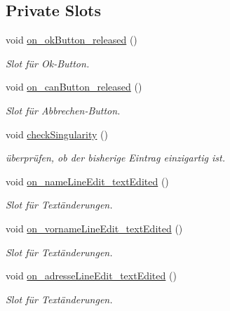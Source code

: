 \subsection*{Private Slots}
\begin{CompactItemize}
\item 
void \hyperlink{class_r_f_i_d_input_dialog_bfc414e920d8c099a56c253ec07a6fa7}{on\_\-okButton\_\-released} ()
\begin{CompactList}\small\item\em Slot für Ok-Button. \item\end{CompactList}\item 
void \hyperlink{class_r_f_i_d_input_dialog_8f58e254774a1995a54ed0be10183ad9}{on\_\-canButton\_\-released} ()
\begin{CompactList}\small\item\em Slot für Abbrechen-Button. \item\end{CompactList}\item 
void \hyperlink{class_r_f_i_d_input_dialog_02ecbebd64e8e4d176f9da497366dede}{checkSingularity} ()
\begin{CompactList}\small\item\em überprüfen, ob der bisherige Eintrag einzigartig ist. \item\end{CompactList}\item 
void \hyperlink{class_r_f_i_d_input_dialog_5318d27b73bdd6b480d2bd7e4393d9b3}{on\_\-nameLineEdit\_\-textEdited} ()
\begin{CompactList}\small\item\em Slot für Textänderungen. \item\end{CompactList}\item 
void \hyperlink{class_r_f_i_d_input_dialog_dbd5b406b288c271329508dff10de89e}{on\_\-vornameLineEdit\_\-textEdited} ()
\begin{CompactList}\small\item\em Slot für Textänderungen. \item\end{CompactList}\item 
void \hyperlink{class_r_f_i_d_input_dialog_088462e0b153f91f99f4cd076cdb014d}{on\_\-adresseLineEdit\_\-textEdited} ()
\begin{CompactList}\small\item\em Slot für Textänderungen. \item\end{CompactList}\item 

\end{CompactItemize}

